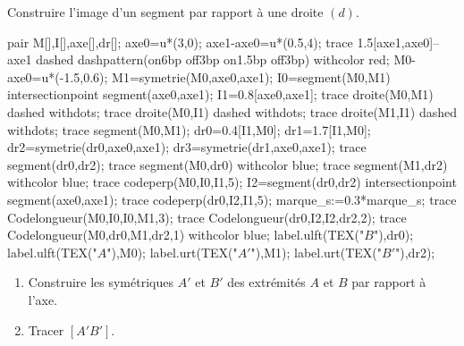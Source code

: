     \begin{methode*1}
        \exercice
        Construire l'image d'un segment par rapport à une droite $(d)$.
        \correction
        \begin{minipage}{0.35\linewidth}
            \begin{center}
                \begin{Geometrie}[CoinHD={(5u,4u)},CoinBG={(0,0)}]
                    pair M[],I[],axe[],dr[];
                    axe0=u*(3,0);
                    axe1-axe0=u*(0.5,4);                
                    trace 1.5[axe1,axe0]--axe1 dashed dashpattern(on6bp off3bp on1.5bp off3bp) withcolor red;
                    M0-axe0=u*(-1.5,0.6);
                    M1=symetrie(M0,axe0,axe1);                
                    I0=segment(M0,M1) intersectionpoint segment(axe0,axe1);
                    I1=0.8[axe0,axe1];
                    trace droite(M0,M1) dashed withdots;
                    trace droite(M0,I1) dashed withdots;
                    trace droite(M1,I1) dashed withdots;
                    trace segment(M0,M1);
                    dr0=0.4[I1,M0];
                    dr1=1.7[I1,M0];
                    dr2=symetrie(dr0,axe0,axe1);
                    dr3=symetrie(dr1,axe0,axe1);
                    trace segment(dr0,dr2);
                    trace segment(M0,dr0) withcolor blue;
                    trace segment(M1,dr2) withcolor blue;
                    trace codeperp(M0,I0,I1,5);
                    I2=segment(dr0,dr2) intersectionpoint segment(axe0,axe1);
                    trace codeperp(dr0,I2,I1,5);
                    marque_s:=0.3*marque_s;
                    trace Codelongueur(M0,I0,I0,M1,3);
                    trace Codelongueur(dr0,I2,I2,dr2,2);
                    trace Codelongueur(M0,dr0,M1,dr2,1) withcolor blue;                
                    label.ulft(TEX("$B$"),dr0);
                    label.ulft(TEX("$A$"),M0);
                    label.urt(TEX("$A'$"),M1);
                    label.urt(TEX("$B'$"),dr2);
                \end{Geometrie}
            \end{center}
        \end{minipage}
        \begin{minipage}{0.65\linewidth}
            \begin{enumerate}
                \item Construire les symétriques $A'$ et $B'$ des extrémités $A$ et $B$ par rapport à l'axe.
                \item Tracer $[A'B']$.
            \end{enumerate}
        \end{minipage}
        \begin{myBox}{}
            \begin{minipage}{\linewidth}
            

\end{minipage}
\end{myBox}
\end{methode*1}
